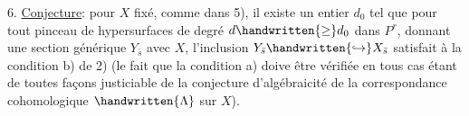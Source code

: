 6.\quad {} \uline{Conjecture}: pour $X$ fixé, comme dans 5),  il existe un entier $d_0$ tel que pour tout pinceau  de hypersurfaces de degré $d\handwritten{\geq}d_0$ dans $P^r$, donnant une section générique $Y_{\bar s}$ avec $X$, l'inclusion $Y_{\bar s}\handwritten{\hookrightarrow}X_{\bar s}$ satisfait à la condition b) de 2) (le fait que la condition a) doive être vérifiée en tous cas étant de toutes façons justiciable de la conjecture d'algébraicité de la correspondance cohomologique $\handwritten{\Lambda}$ sur $X$).

